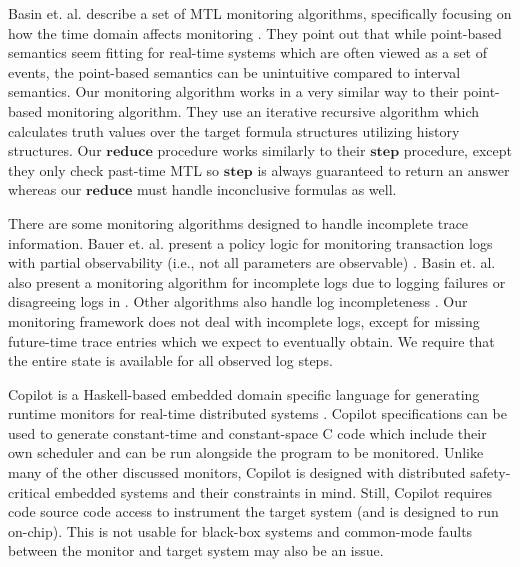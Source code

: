Basin et. al. describe a set of MTL monitoring algorithms, specifically focusing on how the time domain affects monitoring \cite{Basin2012}. They point out that while point-based semantics seem fitting for real-time systems which are often viewed as a set of events, the point-based semantics can be unintuitive compared to interval semantics. Our monitoring algorithm works in a very similar way to their point-based monitoring algorithm. They use an iterative recursive algorithm which calculates truth values over the target formula structures utilizing history structures. 
Our $\mathbf{reduce}$ procedure works similarly to their $\mathbf{step}$ procedure, except they only check past-time MTL so $\mathbf{step}$ is always guaranteed to return an answer whereas our $\mathbf{reduce}$ must handle inconclusive formulas as well.

There are some monitoring algorithms designed to handle incomplete trace information. Bauer et. al. present a policy logic for monitoring transaction logs with partial observability (i.e., not all parameters are observable) \cite{Bauer2009}. Basin et. al. also present a monitoring algorithm for incomplete logs due to logging failures or disagreeing logs in \cite{Basin2013}. Other algorithms also handle log incompleteness \cite{Garg2011,Chowdhury2014}.
Our monitoring framework does not deal with incomplete logs, except for missing future-time trace entries which we expect to eventually obtain. We require that the entire state is available for all observed log steps.



Copilot is a Haskell-based embedded domain specific language for generating runtime monitors for real-time distributed systems \cite{Pike2010}. 
Copilot specifications can be used to generate constant-time and constant-space C code which include their own scheduler and can be run alongside the program to be monitored.
Unlike many of the other discussed monitors, Copilot is designed with distributed safety-critical embedded systems and their constraints in mind. 
Still, Copilot requires code source code access to instrument the target system (and is designed to run on-chip). This is not usable for black-box systems and common-mode faults between the monitor and target system may also be an issue.

